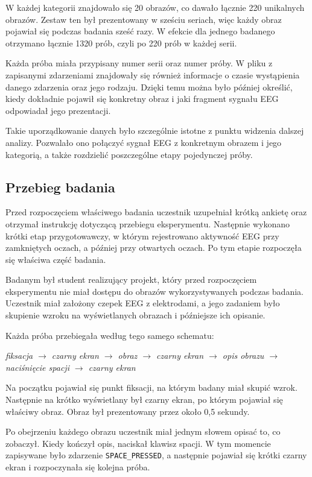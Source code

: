 \documentclass[12pt,a4paper,numbers=enddot,headings=small]{scrartcl} %
\begin{document}
	W każdej kategorii znajdowało się 20 obrazów, co dawało łącznie 220 unikalnych obrazów. Zestaw ten był prezentowany w sześciu seriach, więc każdy obraz pojawiał się podczas badania sześć razy. W efekcie dla jednego badanego otrzymano łącznie 1320 prób, czyli po 220 prób w każdej serii.
	
	Każda próba miała przypisany numer serii oraz numer próby. W pliku z zapisanymi zdarzeniami znajdowały się również informacje o czasie wystąpienia danego zdarzenia oraz jego rodzaju. Dzięki temu można było później określić, kiedy dokładnie pojawił się konkretny obraz i jaki fragment sygnału EEG odpowiadał jego prezentacji.
	
	Takie uporządkowanie danych było szczególnie istotne z punktu widzenia dalszej analizy. Pozwalało ono połączyć sygnał EEG z konkretnym obrazem i jego kategorią, a także rozdzielić poszczególne etapy pojedynczej próby.
	
	\subsection{Przebieg badania}
	
	Przed rozpoczęciem właściwego badania uczestnik uzupełniał krótką ankietę oraz otrzymał instrukcję dotyczącą przebiegu eksperymentu. Następnie wykonano krótki etap przygotowawczy, w którym rejestrowano aktywność EEG przy zamkniętych oczach, a później przy otwartych oczach. Po tym etapie rozpoczęła się właściwa część badania.
	
	Badanym był student realizujący projekt, który przed rozpoczęciem eksperymentu nie miał dostępu do obrazów wykorzystywanych podczas badania. Uczestnik miał założony czepek EEG z elektrodami, a jego zadaniem było skupienie wzroku na wyświetlanych obrazach i późniejsze ich opisanie.
	
	Każda próba przebiegała według tego samego schematu:
	
	\begin{center}
		\textit{fiksacja $\rightarrow$ czarny ekran $\rightarrow$ obraz $\rightarrow$ czarny ekran $\rightarrow$ opis obrazu $\rightarrow$ naciśnięcie spacji $\rightarrow$ czarny ekran}
	\end{center}
	
	Na początku pojawiał się punkt fiksacji, na którym badany miał skupić wzrok. Następnie na krótko wyświetlany był czarny ekran, po którym pojawiał się właściwy obraz. Obraz był prezentowany przez około 0,5 sekundy.
	
	Po obejrzeniu każdego obrazu uczestnik miał jednym słowem opisać to, co zobaczył. Kiedy kończył opis, naciskał klawisz spacji. W tym momencie zapisywane było zdarzenie \texttt{SPACE\_PRESSED}, a następnie pojawiał się krótki czarny ekran i rozpoczynała się kolejna próba.
	
\end{document}
